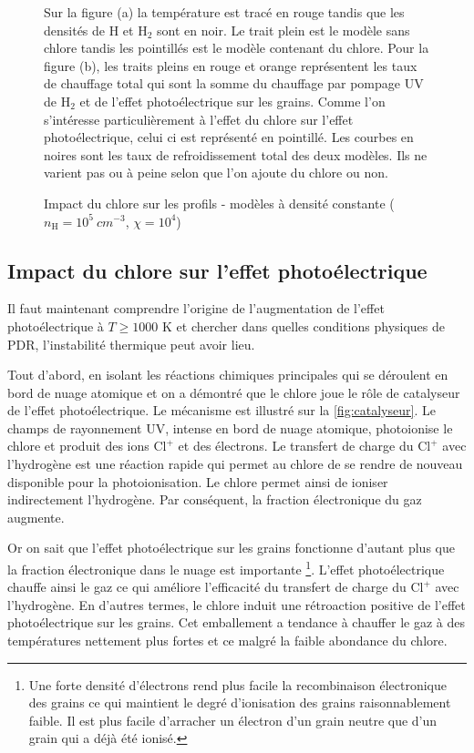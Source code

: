 \begin{figure}[!h]
\begin{subfigure}[t]{0.45\textwidth}
    \end{subfigure}
    \caption{Impact du chlore sur les profils - modèles à densité constante ($n_{\mathrm{H}} = 10^5\ cm^{-3}$, $\chi = 10^4$)}
    \begin{minipage}{\textwidth}
    Sur la figure (a) la température est tracé en rouge tandis que les densités de $\mathrm{H}$ et $\mathrm{H}_2$ sont en noir. Le trait plein est le modèle sans chlore tandis les pointillés est le modèle contenant du chlore. Pour la figure (b), les traits pleins en rouge et orange représentent les taux de chauffage total qui sont la somme du chauffage par pompage UV de $\mathrm{H}_2$ et de l'effet photoélectrique sur les grains. Comme l'on s'intéresse particulièrement à l'effet du chlore sur l'effet photoélectrique, celui ci est représenté en pointillé. Les courbes en noires sont les taux de refroidissement total des deux modèles. Ils ne varient pas ou à peine selon que l'on ajoute du chlore ou non.
    \end{minipage}
\end{figure}


\subsection{Impact du chlore sur l'effet photoélectrique}

Il faut maintenant comprendre l'origine de l'augmentation de l'effet photoélectrique à $T\geq 1000$ K  et chercher dans quelles conditions physiques de PDR, l'instabilité thermique peut avoir lieu. \newline 

Tout d'abord, en isolant les réactions chimiques principales qui se déroulent en bord de nuage atomique et on a démontré que le chlore joue le rôle de catalyseur de l'effet photoélectrique. Le mécanisme est illustré sur la \autoref{fig:catalyseur}.
Le champs de rayonnement UV, intense en bord de nuage atomique, photoionise le chlore et produit des ions $\mathrm{Cl}^+$ et des électrons. Le transfert de charge du $\mathrm{Cl}^+$ avec l'hydrogène est une réaction rapide qui permet au chlore de se rendre de nouveau disponible pour la photoionisation. Le chlore permet ainsi de ioniser indirectement l'hydrogène. Par conséquent, la fraction électronique du gaz augmente.  \newline 

Or on sait que l'effet photoélectrique sur les grains fonctionne d'autant plus que la fraction électronique dans le nuage est importante \footnote{Une forte densité d'électrons rend plus facile la recombinaison électronique des grains ce qui maintient le degré d'ionisation des grains raisonnablement faible. Il est plus facile d'arracher un électron d'un grain neutre que d'un grain qui a déjà été ionisé.}. 
L'effet photoélectrique chauffe ainsi le gaz ce qui améliore l'efficacité du transfert de charge du $\mathrm{Cl}^+$ avec l'hydrogène. 
En d'autres termes, le chlore induit une rétroaction positive de l'effet photoélectrique sur les grains. Cet emballement a tendance à chauffer le gaz à des températures nettement plus fortes et ce malgré la faible abondance du chlore. \newline

